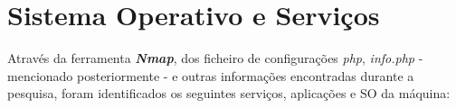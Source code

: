 \documentclass[10pt,english]{article}
\begin{document}

\clearpage


\section{Sistema Operativo e Serviços}
\par Através da ferramenta \textit{\textbf{Nmap}}, dos ficheiro de configurações \textit{php}, \textit{info.php} - mencionado posteriormente - e outras informações encontradas durante a pesquisa, foram identificados os seguintes serviços, aplicações e SO da máquina:
\end{document}
